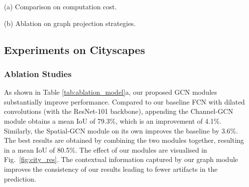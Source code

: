 \documentclass{bmvc2k}
\begin{document}
\begin{table}
  \vspace{0.2cm}
 \begin{minipage}{\dimexpr.54\linewidth}
  \centering
  \small
  \par
  {\footnotesize(a) Comparison on computation cost.}
 \end{minipage}
 \begin{minipage}{\dimexpr.45\linewidth}
  \centering
  \small
  \par
  {\footnotesize(b) Ablation on graph projection strategies.}
 \end{minipage}
 \vspace{3mm}
 \vspace{-5mm}
 \label{tab:ablation_graph_projection}
\end{table} 
\subsection{Experiments on Cityscapes}
\label{sec:exp_cs}


\subsubsection{Ablation Studies}
\label{sec:ablation}


 As shown in Table \ref{tab:ablation_model}a, our proposed GCN modules substantially improve performance.
Compared to our baseline FCN with dilated convolutions (with the ResNet-101 backbone), appending the Channel-GCN module obtains a mean IoU of 79.3\%, which is an improvement of 4.1\%.
Similarly, the Spatial-GCN module on its own improves the baseline by 3.6\%.
The best results are obtained by combining the two modules together, resulting in a mean IoU of 80.5\%.
The effect of our modules are visualised in Fig.~\ref{fig:city_res}.
The contextual information captured by our graph module improves the consistency of our results leading to fewer artifacts in the prediction.
\end{document}
